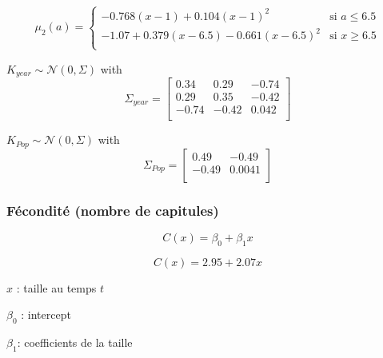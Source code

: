\documentclass[
]{article}
\begin{document}
\[\mu_2(a) = \left\{
    \begin{array}{ll}
        - 0.768 (x - 1) + 0.104(x - 1) ^ 2 & \mbox{si } a \leq 6.5 \\
        -1.07 + 0.379(x - 6.5) - 0.661(x - 6.5) ^ 2 & \mbox{si } x \geq 6.5 \\
    \end{array}
\right.\]

\(K_{year} \sim \mathcal{N}(0,\Sigma)\) with \[\Sigma_{year} =
  \left[ {\begin{array}{cc}
    0.34 & 0.29 & -0.74 \\
    0.29 & 0.35 & -0.42\\
    -0.74 & -0.42 & 0.042\\
  \end{array} } \right]\]

\(K_{Pop} \sim \mathcal{N}(0,\Sigma)\) with \[\Sigma_{Pop} =
  \left[ {\begin{array}{cc}
    0.49 & -0.49 \\
    -0.49 & 0.0041 \\
  \end{array} } \right]\]

\subsubsection{Fécondité (nombre de
capitules)}\label{fuxe9condituxe9-nombre-de-capitules}

\[C(x)=\beta_0+\beta_1x\]

\[C(x)=2.95+2.07x\]

\(x\) : taille au temps \(t\)

\(\beta_0\) : intercept

\(\beta_1\): coefficients de la taille
\end{document}
